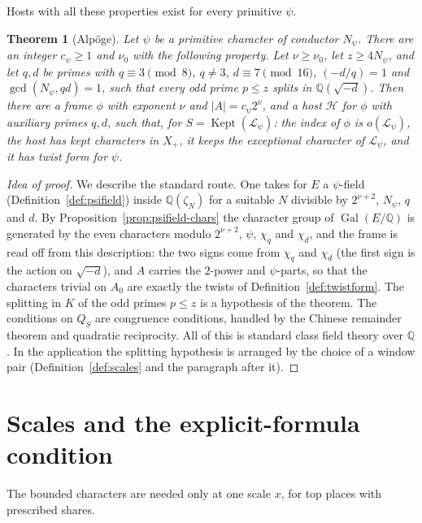 \documentclass[11pt]{amsbook}
\theoremstyle{plain}
\newtheorem{theorem}{Theorem}[section]
\theoremstyle{definition}
\theoremstyle{remark}
\numberwithin{equation}{section}
\numberwithin{figure}{chapter}
\numberwithin{table}{chapter}
\newcommand{\Q}{\mathbb{Q}}
\newcommand{\lev}{\mathscr{L}}
\newcommand{\Kept}{\operatorname{Kept}}
\newcommand{\Gal}{\operatorname{Gal}}
\begin{document}
Hosts with all these properties exist for every primitive $\psi$.

\begin{theorem}[Alp\"oge]\label{thm:fields-exist}
Let $\psi$ be a primitive character of conductor $N_\psi$. There are
an integer $c_\psi\ge1$ and $\nu_0$ with the following
property. Let $\nu\ge\nu_0$,
let $z\ge4N_\psi$, and let $q,d$ be primes with $q\equiv3\pmod8$,
$q\ne3$, $d\equiv7\pmod{16}$, $(-d/q)=1$ and $\gcd(N_\psi,qd)=1$, such
that every odd prime $p\le z$ splits in $\Q(\sqrt{-d})$. Then there
are a frame $\phi$ with exponent $\nu$ and $|A|=c_\psi2^\nu$, and a host
$\mathcal H$ for $\phi$ with auxiliary primes $q,d$, such that, for
$S=\Kept(\lev_\psi)$: the index of $\phi$ is $o(\lev_\psi)$, the host
has kept characters in $X_+$, it keeps the exceptional character of
$\lev_\psi$, and it has twist form for $\psi$.
\end{theorem}

\begin{proof}[Idea of proof]
We describe the standard route. One takes for $E$ a $\psi$-field
(Definition~\ref{def:psifield}) inside $\Q(\zeta_N)$ for a suitable
$N$ divisible by $2^{\nu+2}$, $N_\psi$, $q$ and $d$. By
Proposition~\ref{prop:psifield-chars} the character group of
$\Gal(E/\Q)$ is generated by the even characters modulo $2^{\nu+2}$,
$\psi$, $\chi_q$ and $\chi_d$, and the frame is read off from this
description: the two signs come from $\chi_q$ and $\chi_d$ (the
first sign is the action on $\sqrt{-d}$), and $A$ carries the
$2$-power and $\psi$-parts, so that the characters trivial on $A_0$
are exactly the twists of Definition~\ref{def:twistform}.
The splitting in $K$ of the odd primes $p\le z$ is a hypothesis of
the theorem. The conditions
on $Q_S$ are congruence conditions, handled by the Chinese remainder
theorem and quadratic reciprocity. All of this is standard class field theory
over
$\Q$. In the application the splitting hypothesis is arranged by the
choice of a window pair (Definition~\ref{def:scales} and the paragraph
after it).
\end{proof}

\section{Scales and the explicit-formula condition}

The bounded characters are needed only at one scale $x$, for top
places with prescribed shares.
\end{document}
